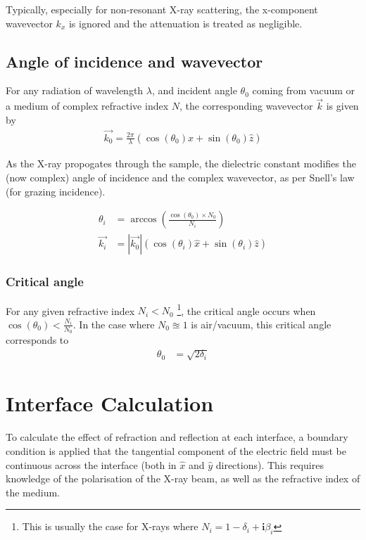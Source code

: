 \documentclass[../main.tex]{subfiles}
\begin{document}
	Typically, especially for non-resonant X-ray scattering, the x-component wavevector $k_x$ is ignored and the attenuation is treated as negligible.

	\subsection{Angle of incidence and wavevector}
	For any radiation of wavelength $\lambda$, and incident angle $\theta_0$ coming from vacuum or a medium of complex refractive index $N$,
	the corresponding wavevector $\vec{k}$ is given by
	\begin{align}
		\vec{k_0} = \frac{2 \pi}{\lambda} \left( \cos(\theta_0) \hat{x} + \sin(\theta_0) \hat{z} \right)
	\end{align}
	
	As the X-ray propogates through the sample, the dielectric constant modifies the (now complex) angle of incidence and the 
	complex wavevector, as per Snell's law (for grazing incidence).

	\begin{align}
		\theta_i &= \arccos\left(\frac{\cos\left(\theta_0\right) \times N_0}{N_i}\right)\\
		\vec{k_i} &= |\vec{k_0}| \left( \cos(\theta_i) \hat{x} + \sin(\theta_i) \hat{z} \right)
	\end{align}	

	\subsubsection{Critical angle}
	For any given refractive index $N_i < N_0$ \footnote{This is usually the case for X-rays where $N_i = 1 - \delta_i + \mathbf{i}\beta_i$}, the critical angle occurs when $\cos\left(\theta_0\right) < \frac{N_i}{N_0}$.
	In the case where $N_0 \approxeq 1$ is air/vacuum, this critical angle corresponds to
	\begin{align}
		\theta_{0} &= \sqrt{2 \delta_i}
	\end{align}

	\section{Interface Calculation}
	To calculate the effect of refraction and reflection at each interface, a boundary condition is applied that the tangential component of the electric field must be continuous across the interface (both in $\hat{x}$ and $\hat{y}$ directions). This requires knowledge of the polarisation of the X-ray beam, as well as the refractive index of the medium.
\end{document}
